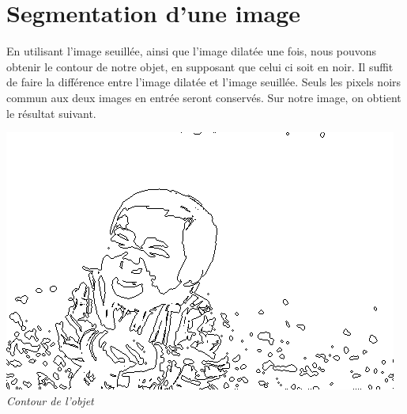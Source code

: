 \documentclass[a4paper,11pt]{article}
\begin{document}
\section{Segmentation d'une image}
En utilisant l'image seuillée, ainsi que l'image dilatée une fois, nous pouvons obtenir le contour de notre objet, en supposant que celui ci soit en noir. Il suffit de faire la différence entre l'image dilatée et l'image seuillée. Seuls les pixels noirs commun aux deux images en entrée seront conservés. Sur notre image, on obtient le résultat suivant.
\begin{center}
\includegraphics[scale=0.7]{babyDiff.png}\\
\textit{Contour de l'objet}
\end{center}
\end{document}
